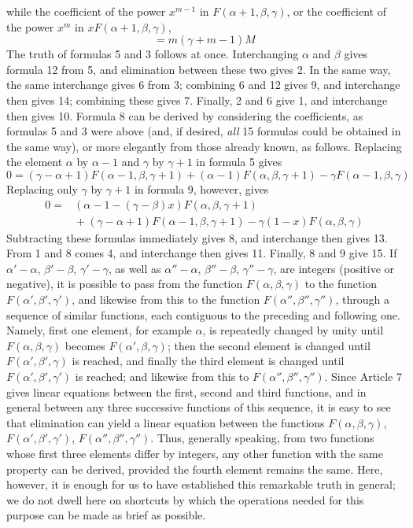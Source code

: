 while the coefficient of the power $x^{m-1}$ in $F(\alpha+1,\beta,\gamma)$, or the coefficient of the power $x^m$ in $xF(\alpha+1,\beta,\gamma)$,
\[
=m(\gamma+m-1)M
\]
The truth of formulas 5 and 3 follows at once. Interchanging $\alpha$ and $\beta$ gives formula 12 from 5, and elimination between these two gives 2. In the same way, the same interchange gives 6 from 3; combining 6 and 12 gives 9, and interchange then gives 14; combining these gives 7. Finally, 2 and 6 give 1, and interchange then gives 10. Formula 8 can be derived by considering the coefficients, as formulas 5 and 3 were above (and, if desired, \textit{all} 15 formulas could be obtained in the same way), or more elegantly from those already known, as follows. Replacing the element $\alpha$ by $\alpha-1$ and $\gamma$ by $\gamma+1$ in formula 5 gives
\[
0=(\gamma-\alpha+1)F(\alpha-1,\beta,\gamma+1)+(\alpha-1)F(\alpha,\beta,\gamma+1)-\gamma F(\alpha-1,\beta,\gamma)
\]
Replacing only $\gamma$ by $\gamma+1$ in formula 9, however, gives
\[
\begin{aligned}0={}&(\alpha-1-(\gamma-\beta)x)F(\alpha,\beta,\gamma+1)\\
&{}+(\gamma-\alpha+1)F(\alpha-1,\beta,\gamma+1)-\gamma(1-x)F(\alpha,\beta,\gamma)\end{aligned}
\]
Subtracting these formulas immediately gives 8, and interchange then gives 13. From 1 and 8 comes 4, and interchange then gives 11. Finally, 8 and 9 give 15.
If $\alpha'-\alpha$, $\beta'-\beta$, $\gamma'-\gamma$, as well as $\alpha''-\alpha$, $\beta''-\beta$, $\gamma''-\gamma$, are integers (positive or negative), it is possible to pass from the function $F(\alpha,\beta,\gamma)$ to the function $F(\alpha',\beta',\gamma')$, and likewise from this to the function $F(\alpha'',\beta'',\gamma'')$, through a sequence of similar functions, each contiguous to the preceding and following one. Namely, first one element, for example $\alpha$, is repeatedly changed by unity until $F(\alpha,\beta,\gamma)$ becomes $F(\alpha',\beta,\gamma)$; then the second element is changed until
$F(\alpha',\beta',\gamma)$ is reached, and finally the third element is changed until $F(\alpha',\beta',\gamma')$ is reached; and likewise from this to $F(\alpha'',\beta'',\gamma'')$. Since Article 7 gives linear equations between the first, second and third functions, and in general between any three successive functions of this sequence, it is easy to see that elimination can yield a linear equation between the functions $F(\alpha,\beta,\gamma)$, $F(\alpha',\beta',\gamma')$, $F(\alpha'',\beta'',\gamma'')$. Thus, generally speaking, from two functions whose first three elements differ by integers, any other function with the same property can be derived, provided the fourth element remains the same. Here, however, it is enough for us to have established this remarkable truth in general; we do not dwell here on shortcuts by which the operations needed for this purpose can be made as brief as possible.
